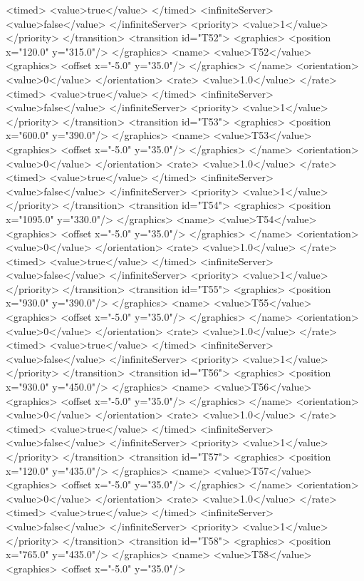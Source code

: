 <timed>
<value>true</value>
</timed>
<infiniteServer>
<value>false</value>
</infiniteServer>
<priority>
<value>1</value>
</priority>
</transition>
<transition id="T52">
<graphics>
<position x="120.0" y="315.0"/>
</graphics>
<name>
<value>T52</value>
<graphics>
<offset x="-5.0" y="35.0"/>
</graphics>
</name>
<orientation>
<value>0</value>
</orientation>
<rate>
<value>1.0</value>
</rate>
<timed>
<value>true</value>
</timed>
<infiniteServer>
<value>false</value>
</infiniteServer>
<priority>
<value>1</value>
</priority>
</transition>
<transition id="T53">
<graphics>
<position x="600.0" y="390.0"/>
</graphics>
<name>
<value>T53</value>
<graphics>
<offset x="-5.0" y="35.0"/>
</graphics>
</name>
<orientation>
<value>0</value>
</orientation>
<rate>
<value>1.0</value>
</rate>
<timed>
<value>true</value>
</timed>
<infiniteServer>
<value>false</value>
</infiniteServer>
<priority>
<value>1</value>
</priority>
</transition>
<transition id="T54">
<graphics>
<position x="1095.0" y="330.0"/>
</graphics>
<name>
<value>T54</value>
<graphics>
<offset x="-5.0" y="35.0"/>
</graphics>
</name>
<orientation>
<value>0</value>
</orientation>
<rate>
<value>1.0</value>
</rate>
<timed>
<value>true</value>
</timed>
<infiniteServer>
<value>false</value>
</infiniteServer>
<priority>
<value>1</value>
</priority>
</transition>
<transition id="T55">
<graphics>
<position x="930.0" y="390.0"/>
</graphics>
<name>
<value>T55</value>
<graphics>
<offset x="-5.0" y="35.0"/>
</graphics>
</name>
<orientation>
<value>0</value>
</orientation>
<rate>
<value>1.0</value>
</rate>
<timed>
<value>true</value>
</timed>
<infiniteServer>
<value>false</value>
</infiniteServer>
<priority>
<value>1</value>
</priority>
</transition>
<transition id="T56">
<graphics>
<position x="930.0" y="450.0"/>
</graphics>
<name>
<value>T56</value>
<graphics>
<offset x="-5.0" y="35.0"/>
</graphics>
</name>
<orientation>
<value>0</value>
</orientation>
<rate>
<value>1.0</value>
</rate>
<timed>
<value>true</value>
</timed>
<infiniteServer>
<value>false</value>
</infiniteServer>
<priority>
<value>1</value>
</priority>
</transition>
<transition id="T57">
<graphics>
<position x="120.0" y="435.0"/>
</graphics>
<name>
<value>T57</value>
<graphics>
<offset x="-5.0" y="35.0"/>
</graphics>
</name>
<orientation>
<value>0</value>
</orientation>
<rate>
<value>1.0</value>
</rate>
<timed>
<value>true</value>
</timed>
<infiniteServer>
<value>false</value>
</infiniteServer>
<priority>
<value>1</value>
</priority>
</transition>
<transition id="T58">
<graphics>
<position x="765.0" y="435.0"/>
</graphics>
<name>
<value>T58</value>
<graphics>
<offset x="-5.0" y="35.0"/>
